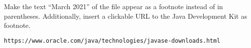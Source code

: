 Make the text \enquote{March 2021} of the file 
 appear as a footnote instead of in 
parentheses. Additionally, insert a clickable URL to the Java Development Kit 
as footnote.


\texttt{https://www.oracle.com/java/technologies/javase-downloads.html}

